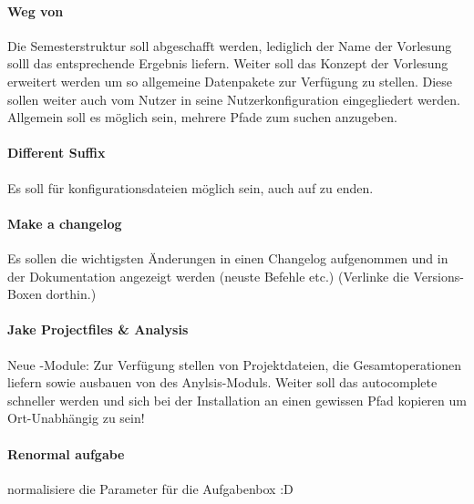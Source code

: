 \paragraph{Weg von }
Die Semesterstruktur soll abgeschafft werden, lediglich der Name der Vorlesung solll das entsprechende Ergebnis liefern. Weiter soll das Konzept der Vorlesung erweitert werden um so allgemeine Datenpakete zur Verfügung zu stellen. Diese sollen weiter auch vom Nutzer in seine Nutzerkonfiguration eingegliedert werden. Allgemein soll es möglich sein, mehrere Pfade zum suchen anzugeben.

\paragraph{Different Suffix}
Es soll für konfigurationsdateien möglich sein, auch auf  zu enden.

\paragraph{Make a changelog}
Es sollen die wichtigsten Änderungen in einen Changelog aufgenommen und in der Dokumentation angezeigt werden (neuste Befehle etc.) (Verlinke die Versions-Boxen dorthin.)

\paragraph{Jake Projectfiles \& Analysis}
Neue \Jake-Module: Zur Verfügung stellen von Projektdateien, die Gesamtoperationen liefern sowie ausbauen von des Anylsis-Moduls. Weiter soll das autocomplete schneller werden und sich \Jake bei der Installation an einen gewissen Pfad kopieren um Ort-Unabhängig zu sein!

\paragraph{Renormal aufgabe}
normalisiere die Parameter für die Aufgabenbox :D
